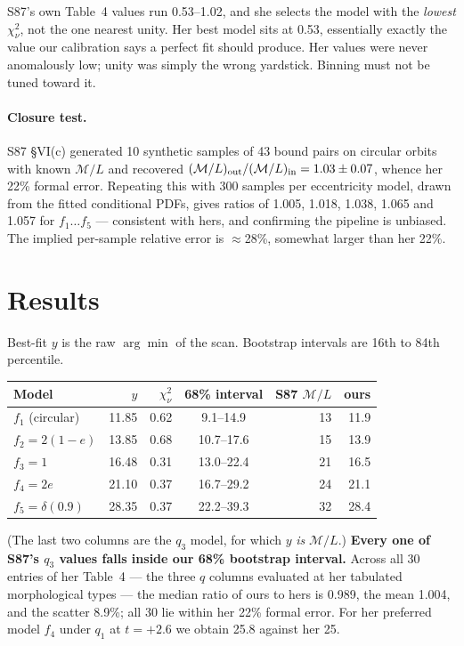 \documentclass[11pt]{article}
\newcommand{\ML}{\ensuremath{\mathcal{M}/L}}
\begin{document}
S87's own Table~4 values run 0.53--1.02, and she selects the model with the
\emph{lowest} $\chi^2_\nu$, not the one nearest unity. Her best model sits at
0.53, essentially exactly the value our calibration says a perfect fit should
produce. Her values were never anomalously low; unity was simply the wrong
yardstick. Binning must not be tuned toward it.

\paragraph{Closure test.} S87 \S VI(c) generated 10 synthetic samples of 43
bound pairs on circular orbits with known \ML{} and recovered
$(\ML)_{\rm out}/(\ML)_{\rm in} = 1.03 \pm 0.07$, whence her 22\% formal error.
Repeating this with 300 samples per eccentricity model, drawn from the fitted
conditional PDFs, gives ratios of 1.005, 1.018, 1.038, 1.065 and 1.057 for
$f_1 \ldots f_5$ --- consistent with hers, and confirming the pipeline is
unbiased. The implied per-sample relative error is $\approx$28\%, somewhat
larger than her 22\%.

\section{Results}
\label{sec:results}

Best-fit $y$ is the raw $\arg\min$ of the scan. Bootstrap intervals are 16th to
84th percentile.

\begin{center}
\begin{tabular}{lrrcrr}
\toprule
Model & $y$ & $\chi^2_\nu$ & 68\% interval & S87 $\mathcal{M}/L$ & ours \\
\midrule
$f_1$ (circular)    & 11.85 & 0.62 & 9.1--14.9  & 13 & 11.9 \\
$f_2 = 2(1-e)$      & 13.85 & 0.68 & 10.7--17.6 & 15 & 13.9 \\
$f_3 = 1$           & 16.48 & 0.31 & 13.0--22.4 & 21 & 16.5 \\
$f_4 = 2e$          & 21.10 & 0.37 & 16.7--29.2 & 24 & 21.1 \\
$f_5 = \delta(0.9)$ & 28.35 & 0.37 & 22.2--39.3 & 32 & 28.4 \\
\bottomrule
\end{tabular}
\end{center}

\noindent
(The last two columns are the $q_3$ model, for which $y$ \emph{is} \ML{}.)
\textbf{Every one of S87's $q_3$ values falls inside our 68\% bootstrap
interval.} Across all 30 entries of her Table~4 --- the three $q$ columns
evaluated at her tabulated morphological types --- the median ratio of ours to
hers is 0.989, the mean 1.004, and the scatter 8.9\%; all 30 lie within her
22\% formal error. For her preferred model $f_4$ under $q_1$ at $t=+2.6$ we
obtain 25.8 against her 25.
\end{document}
